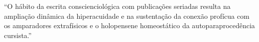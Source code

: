 \documentclass{gescons}
\begin{document}
\begin{multicols}{2}
\begin{pullquote}
    ``O hábito da escrita conscienciológica com publicações seriadas resulta na ampliação dinâmica da hiperacuidade e na sustentação da conexão profícua com os amparadores extrafísicos e o holopensene homeostático da autoparaprocedência cursista.''
\end{pullquote}
    
    \end{multicols}
\end{document}
